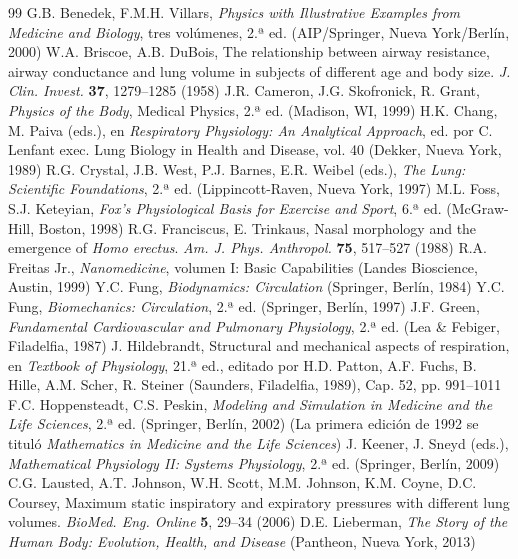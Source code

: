 \documentclass[12pt]{book}
\begin{document}
\FloatBarrier
\clearpage
\begin{thebibliography}{99}
 G.B. Benedek, F.M.H. Villars, \textit{Physics with Illustrative Examples from Medicine and Biology}, tres volúmenes, 2.ª ed. (AIP/Springer, Nueva York/Berlín, 2000)
 W.A. Briscoe, A.B. DuBois, The relationship between airway resistance, airway conductance and lung volume in subjects of different age and body size. \textit{J. Clin. Invest.} \textbf{37}, 1279--1285 (1958)
 J.R. Cameron, J.G. Skofronick, R. Grant, \textit{Physics of the Body}, Medical Physics, 2.ª ed. (Madison, WI, 1999)
 H.K. Chang, M. Paiva (eds.), en \textit{Respiratory Physiology: An Analytical Approach}, ed. por C. Lenfant exec. Lung Biology in Health and Disease, vol. 40 (Dekker, Nueva York, 1989)
 R.G. Crystal, J.B. West, P.J. Barnes, E.R. Weibel (eds.), \textit{The Lung: Scientific Foundations}, 2.ª ed. (Lippincott-Raven, Nueva York, 1997)
 M.L. Foss, S.J. Keteyian, \textit{Fox's Physiological Basis for Exercise and Sport}, 6.ª ed. (McGraw-Hill, Boston, 1998)
 R.G. Franciscus, E. Trinkaus, Nasal morphology and the emergence of \textit{Homo erectus}. \textit{Am. J. Phys. Anthropol.} \textbf{75}, 517--527 (1988)
 R.A. Freitas Jr., \textit{Nanomedicine}, volumen I: Basic Capabilities (Landes Bioscience, Austin, 1999)
 Y.C. Fung, \textit{Biodynamics: Circulation} (Springer, Berlín, 1984)
 Y.C. Fung, \textit{Biomechanics: Circulation}, 2.ª ed. (Springer, Berlín, 1997)
 J.F. Green, \textit{Fundamental Cardiovascular and Pulmonary Physiology}, 2.ª ed. (Lea \& Febiger, Filadelfia, 1987)
 J. Hildebrandt, Structural and mechanical aspects of respiration, en \textit{Textbook of Physiology}, 21.ª ed., editado por H.D. Patton, A.F. Fuchs, B. Hille, A.M. Scher, R. Steiner (Saunders, Filadelfia, 1989), Cap. 52, pp. 991--1011
 F.C. Hoppensteadt, C.S. Peskin, \textit{Modeling and Simulation in Medicine and the Life Sciences}, 2.ª ed. (Springer, Berlín, 2002) (La primera edición de 1992 se tituló \textit{Mathematics in Medicine and the Life Sciences})
 J. Keener, J. Sneyd (eds.), \textit{Mathematical Physiology II: Systems Physiology}, 2.ª ed. (Springer, Berlín, 2009)
 C.G. Lausted, A.T. Johnson, W.H. Scott, M.M. Johnson, K.M. Coyne, D.C. Coursey, Maximum static inspiratory and expiratory pressures with different lung volumes. \textit{BioMed. Eng. Online} \textbf{5}, 29--34 (2006)
 D.E. Lieberman, \textit{The Story of the Human Body: Evolution, Health, and Disease} (Pantheon, Nueva York, 2013)

\end{thebibliography}
\end{document}
